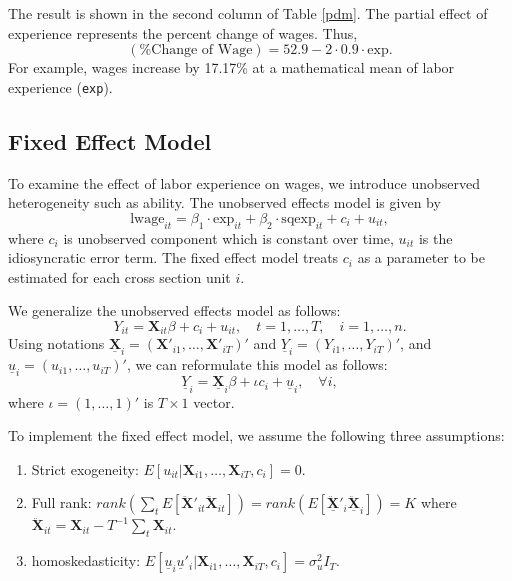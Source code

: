 \documentclass[
  12pt,
]{article}
\providecommand{\tightlist}{%
  \setlength{\itemsep}{0pt}\setlength{\parskip}{0pt}}
\begin{document}
The result is shown in the second column of Table \ref{pdm}. The partial
effect of experience represents the percent change of wages. Thus, \[
  (\text{\% Change of Wage}) = 52.9 - 2 \cdot 0.9 \cdot \text{exp}.
\] For example, wages increase by 17.17\% at a mathematical mean of
labor experience (\texttt{exp}).

\hypertarget{fixed-effect-model}{%
\subsection{Fixed Effect Model}\label{fixed-effect-model}}

To examine the effect of labor experience on wages, we introduce
unobserved heterogeneity such as ability. The unobserved effects model
is given by \[
  \text{lwage}_{it} = 
  \beta_1 \cdot \text{exp}_{it} +
  \beta_2 \cdot \text{sqexp}_{it} + 
  c_i + u_{it},
\] where \(c_i\) is unobserved component which is constant over time,
\(u_{it}\) is the idiosyncratic error term. The fixed effect model
treats \(c_i\) as a parameter to be estimated for each cross section
unit \(i\).

We generalize the unobserved effects model as follows: \[
  Y_{it} = \mathbf{X}_{it} \beta + c_i + u_{it}, \quad t = 1, \ldots, T, \quad i = 1, \ldots, n.
\] Using notations
\(\underline{\mathbf{X}}_i = (\mathbf{X}'_{i1}, \ldots, \mathbf{X}'_{iT})'\)
and \(\underline{Y}_i = (Y_{i1}, \ldots, Y_{iT})'\), and
\(\underline{u}_i = (u_{i1}, \ldots, u_{iT})'\), we can reformulate this
model as follows: \[
  \underline{Y}_i = \underline{\mathbf{X}}_i \beta + \iota c_i + \underline{u}_i, \quad \forall i,
\] where \(\iota = (1, \ldots, 1)'\) is \(T \times 1\) vector.

To implement the fixed effect model, we assume the following three
assumptions:

\begin{enumerate}
\def\labelenumi{\arabic{enumi}.}
\tightlist
\item
  Strict exogeneity:
  \(E[u_{it} | \mathbf{X}_{i1}, \ldots, \mathbf{X}_{iT}, c_i] = 0\).
\item
  Full rank:
  \(rank(\sum_t E[\ddot{\mathbf{X}}'_{it}\ddot{\mathbf{X}}_{it}]) = rank(E[\ddot{\underline{\mathbf{X}}}'_i\ddot{\underline{\mathbf{X}}}_i]) = K\)
  where
  \(\ddot{\mathbf{X}}_{it} = \mathbf{X}_{it} - T^{-1}\sum_t \mathbf{X}_{it}\).
\item
  homoskedasticity:
  \(E[\underline{u}_i \underline{u}'_i|\mathbf{X}_{i1}, \ldots, \mathbf{X}_{iT}, c_i] = \sigma^2_u I_T\).
\end{enumerate}
\end{document}
